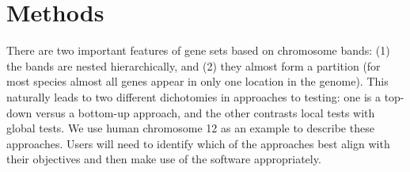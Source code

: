 \documentclass[11pt]{article}
\begin{document}








\section{Methods}



There are two important features of gene sets based on chromosome
bands: (1) the bands are nested hierarchically, and (2) they almost
form a partition (for most species almost all genes appear in only one
location in the genome).  This naturally leads to two different
dichotomies in approaches to testing: one is a top-down versus a
bottom-up approach, and the other contrasts local tests with global
tests.  We use human chromosome 12 as an example to describe these
approaches.  Users will need to identify which of the approaches best
align with their objectives and then make use of the software
appropriately.
\end{document}
